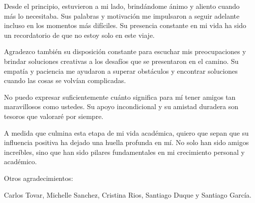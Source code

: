 \begin{spacing}{1.5}
  Desde el principio, estuvieron a mi lado, brindándome ánimo y aliento cuando más lo necesitaba. Sus palabras y motivación me impulsaron a seguir adelante incluso en los momentos más difíciles. Su presencia constante en mi vida ha sido un recordatorio de que no estoy solo en este viaje.

  Agradezco también su disposición constante para escuchar mis preocupaciones y brindar soluciones creativas a los desafíos que se presentaron en el camino. Su empatía y paciencia me ayudaron a superar obstáculos y encontrar soluciones cuando las cosas se volvían complicadas.

  No puedo expresar suficientemente cuánto significa para mí tener amigos tan maravillosos como ustedes. Su apoyo incondicional y su amistad duradera son tesoros que valoraré por siempre.

  A medida que culmina esta etapa de mi vida académica, quiero que sepan que su influencia positiva ha dejado una huella profunda en mí. No solo han sido amigos increíbles, sino que han sido pilares fundamentales en mi crecimiento personal y académico.

  Otros agradecimientos:

  Carlos Tovar, Michelle Sanchez, Cristina Rios, Santiago Duque y Santiago García.

  \mylinespacing
  \mylinespacing
  \begin{tightcenter}
  \end{tightcenter}
\end{spacing}